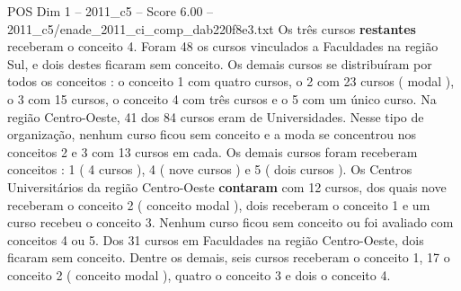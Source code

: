 \begin{textsample}{POS Dim 1 – 2011\_c5 – Score 6.00 – 2011\_c5/enade\_2011\_ci\_comp\_dab220f8e3.txt}
Os três cursos \textbf{restantes} receberam o conceito 4.
Foram 48 os cursos vinculados a Faculdades na região Sul, e dois destes ficaram sem conceito.
Os demais cursos se distribuíram por todos os conceitos : o conceito 1 com quatro cursos, o 2 com 23 cursos ( modal ), o 3 com 15 cursos, o conceito 4 com três cursos e o 5 com um único curso.
Na região Centro-Oeste, 41 dos 84 cursos eram de Universidades.
Nesse tipo de organização, nenhum curso ficou sem conceito e a moda se concentrou nos conceitos 2 e 3 com 13 cursos em cada.
Os demais cursos foram receberam conceitos : 1 ( 4 cursos ), 4 ( nove cursos ) e 5 ( dois cursos ).
Os Centros Universitários da região Centro-Oeste \textbf{contaram} com 12 cursos, dos quais nove receberam o conceito 2 ( conceito modal ), dois receberam o conceito 1 e um curso recebeu o conceito 3.
Nenhum curso ficou sem conceito ou foi avaliado com conceitos 4 ou 5.
Dos 31 cursos em Faculdades na região Centro-Oeste, dois ficaram sem conceito.
Dentre os demais, seis cursos receberam o conceito 1, 17 o conceito 2 ( conceito modal ), quatro o conceito 3 e dois o conceito 4.

\end{textsample}
